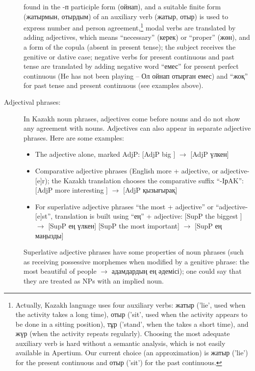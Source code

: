 \documentclass[11pt]{article}
\begin{document}
\begin{description}
  found in the -п participle form (ойнап), and a suitable finite form  (жатырмын, отырдым) of an auxiliary 
  verb (жатыр, отыр) is used to express number and person agreement,\footnote{Actually, Kazakh language uses four auxiliary verbs: жатыр ('lie', 
      used when the activity takes a long time), отыр ('sit', used when the activity appears to be done in a sitting position), тұр ('stand', 
      when the takes a short time), and жүр (when the activity repeats regularly). Choosing the most adequate auxiliary verb is 
      hard without a semantic analysis, which is not easily available in Apertium. Our current choice (an approximation) 
      is жатыр ('lie') for the present continuous and отыр ('sit') for the past continuous.} 
  modal verbs are translated by adding adjectives, which means ``necessary'' (керек) or ``proper'' (жөн), 
  and a form of the copula (absent in present tense); the subject receives the genitive or dative case; negative 
  verbs for present continuous and past tense are translated by adding negative word ``емес'' for present 
  perfect continuous (He has not been playing -- Ол ойнап отырған емес) and  ``жоқ'' for past tense and 
  present continuous (see examples above).
\item[Adjectival phrases:] In Kazakh noun phrases, adjectives come before nouns and do not show any agreement 
  with nouns.  Adjectives can also appear in separate adjective phrases. Here are some examples:
\begin{itemize}
\item The adjective alone, marked AdjP: [AdjP big ] $\rightarrow$ [AdjP үлкен] 
\item Comparative adjective phrases  (English more + adjective, or adjective-[e]r); the Kazakh translation 
   chooses the comparative suffix ``-{I}р{A}{K}'': [AdjP  more  interesting ]  $\rightarrow$ [AdjP қызығырақ]
\item For superlative adjective phrases  ``the most + adjective''  or ``adjective-[e]st'', translation 
   is built using ``ең'' + adjective:  [SupP  the biggest ]  $\rightarrow$ [SupP ең үлкен] 
   [SupP  the most important]   $\rightarrow$ [SupP ең маңызды]
\end{itemize}
Superlative adjective phrases have some properties of noun phrases (such as receiving possessive morphemes when 
modified by a genitive phrase: the most beautiful of people $\rightarrow$ адамдардың ең әдемісі); one could 
say that they are treated as NPs with an implied noun.
\end{description}
\end{document}
